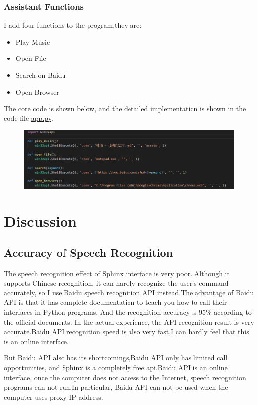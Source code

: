 \documentclass{hci}
\begin{document}
\subsubsection{Assistant Functions}
I add four functions to the program,they are: 
\begin{itemize}
	\item Play Music
	\item Open File
	\item Search on Baidu
	\item Open Browser
\end{itemize}
The core code is shown below, and the detailed implementation is shown in the code file \underline{app.py}.
\begin{figure}[htb]
	\centering
	\includegraphics[width=0.9\linewidth]{../picture/11}
	\label{figure13}
\end{figure}

\section{Discussion}
\subsection{Accuracy of Speech Recognition}
The speech recognition effect of Sphinx interface is very poor. Although it supports Chinese recognition, it can hardly recognize the user's command accurately, so I use Baidu speech recognition API instead.The advantage of Baidu API is that it has complete documentation to teach you how to call their interfaces in Python programs. And the recognition accuracy is 95\% according to the official documents. In the actual experience, the API recognition result is very accurate.Baidu API recognition speed is also very fast,I  can hardly feel that this is an online interface.

But Baidu API also has its shortcomings,Baidu API only has limited call opportunities, and Sphinx is a completely free api.Baidu API is an online interface, once the computer does not access to the Internet, speech recognition programs can not run.In particular, Baidu API can not be used when the computer uses proxy IP address.
\end{document}

